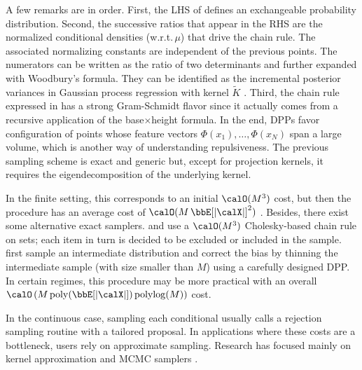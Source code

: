 \documentclass[twoside,11pt]{article}
\begin{document}
        A few remarks are in order.
        First, the LHS of  defines an exchangeable probability distribution.
        Second, the successive ratios that appear in the RHS are the normalized conditional densities (w.r.t.\,$\mu$) that drive the chain rule.
        The associated normalizing constants are independent of the previous points.
        The numerators can be written as the ratio of two determinants and further expanded with Woodbury's formula.
        They can be identified as the incremental posterior variances in Gaussian process regression with kernel $\tilde{K}$ \citep[Equation 2.26]{RaWi06}.
        Third, the chain rule expressed in  has a strong Gram-Schmidt flavor since it actually comes from a recursive application of the base$\times$height formula.
        In the end, DPPs favor configuration of points whose feature vectors $\Phi(x_1),\dots, \Phi(x_N)$ span a large volume, which is another way of understanding repulsiveness.
        The previous sampling scheme is exact and generic but, except for projection kernels, it requires the eigendecomposition of the underlying kernel.

        In the finite setting, this corresponds to an initial $\calO(M^3)$ cost, but then the procedure has an average cost of $\calO(M\Expe{|\calX|}^2)$
        \citep[see, e.g.,][]{Gil14,TrBaAm18}.
        Besides, there exist some alternative exact samplers.
        \citet{Pou19} and \citet{LaGaDe18} use a $\calO(M^3)$ Cholesky-based chain rule on sets; each item in turn is decided to be excluded or included in the sample.
        \citet{DeCaVa19} first sample an intermediate distribution and correct the bias by thinning the intermediate sample (with size smaller than $M$) using a carefully designed DPP.
        In certain regimes, this procedure may be more practical with an overall
        $\calO\lrp{M \operatorname{poly}(\Expe{|\calX|}) \operatorname{polylog}(M)}$ cost.

        In the continuous case, sampling each conditional usually calls a rejection sampling routine with a tailored proposal.
        In applications where these costs are a bottleneck, users rely on approximate sampling.
        Research has focused mainly on kernel approximation \citep{AKFT13} and MCMC samplers \citep{AnGhRe16, LiJeSr16c, GaBaVa17}.
\end{document}
